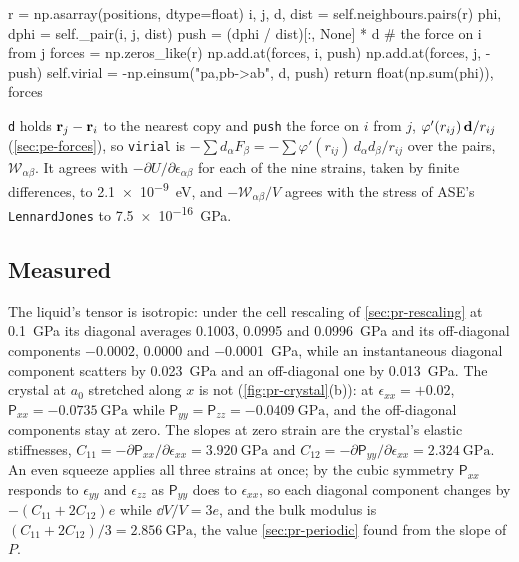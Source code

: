 \begin{code}
        r = np.asarray(positions, dtype=float)
        i, j, d, dist = self.neighbours.pairs(r)
        phi, dphi = self._pair(i, j, dist)
        push = (dphi / dist)[:, None] * d  # the force on i from j
        forces = np.zeros_like(r)
        np.add.at(forces, i, push)
        np.add.at(forces, j, -push)
        self.virial = -np.einsum("pa,pb->ab", d, push)
        return float(np.sum(phi)), forces
\end{code}

\noindent \texttt{d} holds $\bm{\mathrm{r}}_j - \bm{\mathrm{r}}_i$ to the nearest copy and
\texttt{push} the force on $i$ from $j$, $\varphi'(r_{ij})\,\bm{\mathrm{d}}/r_{ij}$
(\cref{sec:pe-forces}), so \texttt{virial} is $-\sum d_\alpha F_\beta =
-\sum\varphi'(r_{ij})\,d_\alpha d_\beta/r_{ij}$ over the pairs,
$\mathcal{W}_{\alpha\beta}$. It agrees with $-\partial U/\partial
\epsilon_{\alpha\beta}$ for each of the nine strains, taken by finite
differences, to \SI{2.1e-9}{\electronvolt}, and $-\mathcal{W}_{\alpha\beta}
/V$ agrees with the stress of ASE's \texttt{LennardJones} to
\SI{7.5e-16}{\giga\pascal}.

\subsection*{Measured}

The liquid's tensor is isotropic: under the cell rescaling of
\cref{sec:pr-rescaling} at \SI{0.1}{\giga\pascal} its diagonal averages
0.1003, 0.0995 and \SI{0.0996}{\giga\pascal} and its off-diagonal
components $-0.0002$, 0.0000 and \SI{-0.0001}{\giga\pascal}, while an
instantaneous diagonal component scatters by \SI{0.023}{\giga\pascal} and
an off-diagonal one by \SI{0.013}{\giga\pascal}. The crystal at $a_0$
stretched along $x$ is not (\cref{fig:pr-crystal}(b)): at
$\epsilon_{xx} = +0.02$, $\mathsf{P}_{xx} = \SI{-0.0735}{\giga\pascal}$ while
$\mathsf{P}_{yy} = \mathsf{P}_{zz} = \SI{-0.0409}{\giga\pascal}$, and the
off-diagonal components stay at zero. The slopes at zero strain are the
crystal's elastic stiffnesses, $C_{11} = -\partial\mathsf{P}_{xx}/\partial
\epsilon_{xx} = \SI{3.920}{\giga\pascal}$ and $C_{12} = -\partial
\mathsf{P}_{yy}/\partial\epsilon_{xx} = \SI{2.324}{\giga\pascal}$. An even
squeeze applies all three strains at once; by the cubic symmetry
$\mathsf{P}_{xx}$ responds to $\epsilon_{yy}$ and $\epsilon_{zz}$ as
$\mathsf{P}_{yy}$ does to $\epsilon_{xx}$, so each diagonal component
changes by $-(C_{11} + 2C_{12})e$ while $\dd V/V = 3e$, and the bulk
modulus is $(C_{11} + 2C_{12})/3 = \SI{2.856}{\giga\pascal}$, the value
\cref{sec:pr-periodic} found from the slope of $P$.

